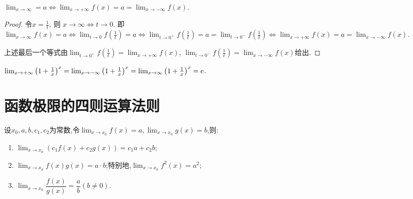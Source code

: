 \begin{theorem}
    $\lim _{x \to \infty} = a \Leftrightarrow \lim _{x \to +\infty} f(x) = a = \lim _{x \to -\infty} f(x)$.
\end{theorem}

\begin{proof}
    令$x = \frac1t$, 则 $x \to \infty \Leftrightarrow t \to 0$. 即 $\lim _{x \to \infty} f(x) = a \Leftrightarrow \lim _{t \to 0} f\left( \frac1t \right) = a \Leftrightarrow \lim _{t \to 0^+} f\left( \frac1t \right) = a = \lim _{t \to 0^-} f\left( \frac1t \right) \Leftrightarrow \lim _{x \to +\infty} f(x) = a = \lim _{x \to -\infty} f(x)$.

    上述最后一个等式由$\lim_{t \to 0^+} f\left( \frac1t \right) = \lim_{x \to +\infty} f(x)$, $\lim_{t \to 0^-} f\left( \frac1t \right) = \lim_{x \to -\infty} f(x)$给出.
\end{proof}

\begin{example}
    $ \lim_{x \to +\infty} \left(1+\frac 1x \right)^x = \lim_{x \to -\infty} \left(1+\frac 1x \right)^x = \lim _{x \to \infty} \left(1+\frac 1x \right)^x = \mathrm{e}$.
\end{example}

\section{函数极限的四则运算法则}

\begin{theorem}
    设$x_0,a,b,c_1,c_2$为常数,令$\lim _{x \to x_0} f(x) = a, \lim _{x \to x_0} g(x) = b$,则:

    \begin{enumerate}
        \item $\lim _{x \to x_0} (c_1 f(x) + c_2 g(x)) = c_1 a + c_2 b$;
        \item $\lim _{x \to x_0} f(x)g(x) = a \cdot b$;特别地,$\lim _{x \to x_0} f^2(x) = a^2$;
        \item $\lim _{x \to x_0} \dfrac{f(x)}{g(x)} = \dfrac{a}{b} (b \neq 0)$.
    \end{enumerate}
\end{theorem}

